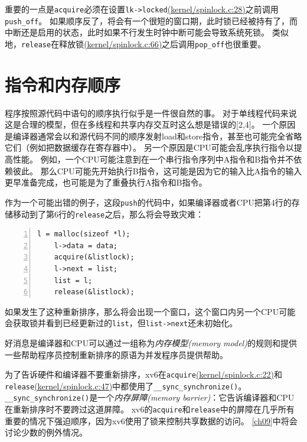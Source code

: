 重要的一点是\texttt{acquire}必须在设置\texttt{lk->locked}\href{https://github.com/mit-pdos/xv6-riscv/blob/risc/kernel/spinlock.c#L28}{(kernel/spinlock.c:28)}之前调用\texttt{push\_off}。
如果顺序反了，将会有一个很短的窗口期，此时锁已经被持有了，而中断还是启用的状态，此时如果不行发生时钟中断可能会导致系统死锁。
类似地，\texttt{release}在释放锁\href{https://github.com/mit-pdos/xv6-riscv/blob/risc/kernel/spinlock.c#L66}{(kernel/spinlock.c:66)}之后调用\texttt{pop\_off}也很重要。

\section{指令和内存顺序}
程序按照源代码中语句的顺序执行似乎是一件很自然的事。
对于单线程代码来说这是合理的模型，但在多线程和共享内存交互时这么想是错误的[2,4]。
一个原因是编译器通常会以和源代码不同的顺序发射load和store指令，甚至也可能完全省略它们（例如把数据缓存在寄存器中）。
另一个原因是CPU可能会乱序执行指令以提高性能。
例如，一个CPU可能注意到在一个串行指令序列中A指令和B指令并不依赖彼此。
那么CPU可能先开始执行B指令，这可能是因为它的输入比A指令的输入更早准备完成，也可能是为了重叠执行A指令和B指令。

作为一个可能出错的例子，这段\texttt{push}的代码中，如果编译器或者CPU把第4行的存储移动到了第6行的\texttt{release}之后，那么将会导致灾难：
\begin{lstlisting}[numbers=left]
    l = malloc(sizeof *l);
    l->data = data;
    acquire(&listlock);
    l->next = list;
    list = l;
    release(&listlock);
\end{lstlisting}
如果发生了这种重新排序，那么将会出现一个窗口，这个窗口内另一个CPU可能会获取锁并看到已经更新过的\texttt{list}，但\texttt{list->next}还未初始化。

好消息是编译器和CPU可以通过一组称为\emph{内存模型(memory model)}的规则和提供一些帮助程序员控制重新排序的原语为并发程序员提供帮助。

为了告诉硬件和编译器不要重新排序，xv6在\texttt{acquire}\href{https://github.com/mit-pdos/xv6-riscv/blob/risc/kernel/spinlock.c#L22}{(kernel/spinlock.c:22)}和\texttt{release}\href{https://github.com/mit-pdos/xv6-riscv/blob/risc/kernel/spinlock.c#L47}{(kernel/spinlock.c:47)}中都使用了\texttt{\_\_sync\_synchronize()}。
\texttt{\_\_sync\_synchronize()}是一个\emph{内存屏障(memory barrier)}：它告诉编译器和CPU在重新排序时不要跨过这道屏障。
xv6的\texttt{acquire}和\texttt{release}中的屏障在几乎所有重要的情况下强迫顺序，因为xv6使用了锁来控制共享数据的访问。
\autoref{ch09}中将会讨论少数的例外情况。

